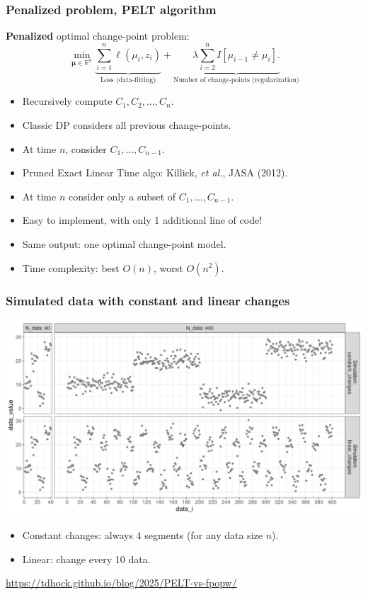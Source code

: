 \documentclass{beamer}
\newcommand{\RR}{\mathbb R}
\begin{document}
\begin{frame}
  \frametitle{Penalized problem, PELT algorithm}
  \textbf{Penalized} optimal change-point problem:
$$
\min_{
  \mathbf \mu\in\RR^{n}
}
\underbrace{\sum_{i=1}^{n} \ell( \mu_i,  z_i)}_{\text{Loss (data-fitting)}} + \underbrace{\lambda\sum_{i=2}^n I[\mu_{i-1}\neq \mu_i].}_{\text{Number of change-points (regularization)}}
$$
\begin{itemize}
\item Recursively compute $C_{1}, C_2,\dots, C_{n}$.
\item Classic DP considers all previous change-points.
\item At time $n$, consider $C_1,\dots,C_{n-1}$.
\item Pruned Exact Linear Time algo: Killick, \emph{et al.}, JASA (2012).
\item At time $n$ consider only a subset of $C_1,\dots,C_{n-1}$.
\item Easy to implement, with only 1 additional line of code!
\item Same output: one optimal change-point model.
\item Time complexity: best $O(n)$, worst $O(n^2)$.
\end{itemize}
\end{frame}


\begin{frame}
  \frametitle{Simulated data with constant and linear changes}
  \includegraphics[width=\textwidth]{figure-sim-linear-constant-changes.png}

  \begin{itemize}
  \item Constant changes: always 4 segments (for any data size $n$).
  \item Linear: change every 10 data.
  \end{itemize}
  
  \url{https://tdhock.github.io/blog/2025/PELT-vs-fpopw/}
\end{frame}
\end{document}
